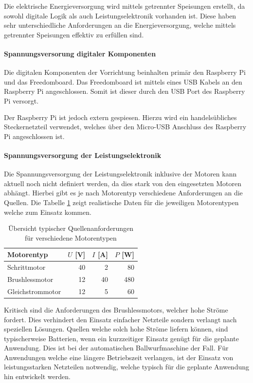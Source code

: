 Die elektrische Energieversorgung wird mittels getrennter Speisungen erstellt,
da sowohl digitale Logik als auch Leistungselektronik vorhanden ist. Diese
haben sehr unterschiedliche Anforderungen an die Energieversorgung, welche
mittels getrennter Speisungen effektiv zu erfüllen sind.

\paragraph{Spannungsversorung digitaler Komponenten}
Die digitalen Komponenten der Vorrichtung beinhalten primär den
Raspberry Pi und das Freedomboard. Das Freedomboard ist mittels eines USB
Kabels an den Raspberry Pi angeschlossen. Somit ist dieser durch den
USB Port des Raspberry Pi versorgt.

Der Raspberry Pi ist jedoch extern gespiesen. Hierzu wird ein
handelsübliches Steckernetzteil verwendet, welches über den Micro-USB
Anschluss des Raspberry Pi angeschlossen ist.

\paragraph{Spannungsversorgung der Leistungselektronik}
Die Spannungsversorgung der Leistungselektronik inklusive
der Motoren kann aktuell noch nicht definiert werden, da dies stark von den
eingesetzten Motoren abhängt. Hierbei gibt es je nach Motorentyp verschiedene
Anforderungen an die Quellen. Die Tabelle \ref{tab:power-requirement} zeigt
realistische Daten für die jeweiligen Motorentypen welche zum Einsatz kommen.

\begin{table}[h!]
	\centering
	\begin{tabular}{l r r r}
		Motorentyp
			& $U$ [V]
			& $I$ [A] 
			& $P$ [W] \\
		\hline
		Schrittmotor
			& 40
			& 2 
			& 80 \\
		Brushlessmotor
			& 12
			& 40
			& 480 \\
		Gleichstrommotor
			& 12
			& 5
			& 60 \\
	\end{tabular}
	\caption{Übersicht typischer Quellenanforderungen für verschiedene
		Motorentypen}
	\label{tab:power-requirement}
\end{table}

Kritisch sind die Anforderungen des Brushlessmotors, welcher hohe Ströme
fordert. Dies verhindert den Einsatz einfacher Netzteile sondern verlangt
nach speziellen Lösungen. Quellen welche solch hohe Ströme liefern können,
sind typischerweise Batterien, wenn ein kurzzeitiger Einsatz genügt für die
geplante Anwendung. Dies ist bei der automatischen Ballwurfmaschine der
Fall. Für Anwendungen welche eine längere Betriebszeit verlangen, ist der
Einsatz von leistungsstarken Netzteilen notwendig, welche typisch für die
geplante Anwendung hin entwickelt werden.

